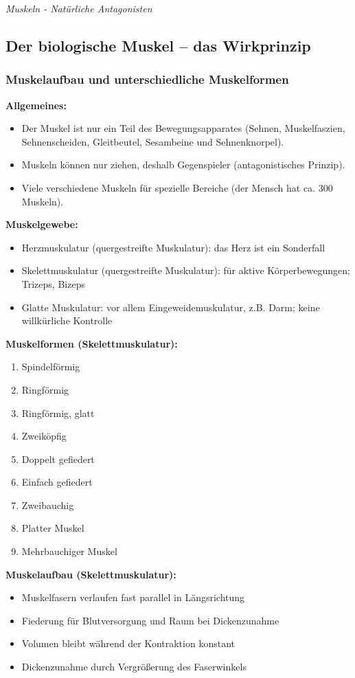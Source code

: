 \emph{Muskeln - Natürliche Antagonisten}

\subsection{Der biologische Muskel – das Wirkprinzip}
\subsubsection{Muskelaufbau und unterschiedliche Muskelformen}
\textbf{Allgemeines:}
\begin{itemize}
	\item Der Muskel ist nur ein Teil des Bewegungsapparates (Sehnen, Muskelfaszien, Sehnenscheiden, Gleitbeutel, Sesambeine und Sehnenknorpel).
	\item Muskeln können nur ziehen, deshalb Gegenspieler (antagonistisches Prinzip).
	\item Viele verschiedene Muskeln für spezielle Bereiche (der Mensch hat ca. 300 Muskeln).
\end{itemize}
\textbf{Muskelgewebe:}
\begin{itemize}
	\item Herzmuskulatur (quergestreifte Muskulatur): das Herz ist ein Sonderfall
	\item Skelettmuskulatur (quergestreifte Muskulatur): für aktive Körperbewegungen; Trizeps, Bizeps
	\item Glatte Muskulatur: vor allem Eingeweidemuskulatur, z.B. Darm; keine willkürliche Kontrolle
\end{itemize}
\textbf{Muskelformen (Skelettmuskulatur):}
\begin{enumerate}
	\item Spindelförmig
	\item Ringförmig
	\item Ringförmig, glatt
	\item Zweiköpfig
	\item Doppelt gefiedert
	\item Einfach gefiedert
	\item Zweibauchig
	\item Platter Muskel
	\item Mehrbauchiger Muskel
\end{enumerate}
\textbf{Muskelaufbau (Skelettmuskulatur):}
\begin{itemize}
	\item Muskelfasern verlaufen fast parallel in Längsrichtung
	\item Fiederung für Blutversorgung und Raum bei Dickenzunahme
	\item Volumen bleibt während der Kontraktion konstant 
	\item Dickenzunahme durch Vergrößerung des Faserwinkels
\end{itemize}
